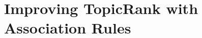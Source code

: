 \section{Improving TopicRank with Association Rules}
\label{improving_topicRank_with_association_rules}

